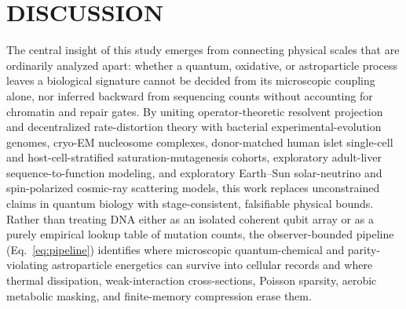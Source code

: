 \documentclass[10pt,letterpaper]{article}
\theoremstyle{plain}
\theoremstyle{definition}
\begin{document}
\section*{DISCUSSION}

The central insight of this study emerges from connecting physical scales that are ordinarily analyzed apart: whether a quantum, oxidative, or astroparticle process leaves a biological signature cannot be decided from its microscopic coupling alone, nor inferred backward from sequencing counts without accounting for chromatin and repair gates. By uniting operator-theoretic resolvent projection and decentralized rate-distortion theory with bacterial experimental-evolution genomes, cryo-EM nucleosome complexes, donor-matched human islet single-cell and host-cell-stratified saturation-mutagenesis cohorts, exploratory adult-liver sequence-to-function modeling, and exploratory Earth--Sun solar-neutrino and spin-polarized cosmic-ray scattering models, this work replaces unconstrained claims in quantum biology with stage-consistent, falsifiable physical bounds. Rather than treating DNA either as an isolated coherent qubit array or as a purely empirical lookup table of mutation counts, the observer-bounded pipeline (Eq.~\eqref{eq:pipeline}) identifies where microscopic quantum-chemical and parity-violating astroparticle energetics can survive into cellular records and where thermal dissipation, weak-interaction cross-sections, Poisson sparsity, aerobic metabolic masking, and finite-memory compression erase them.
\end{document}

